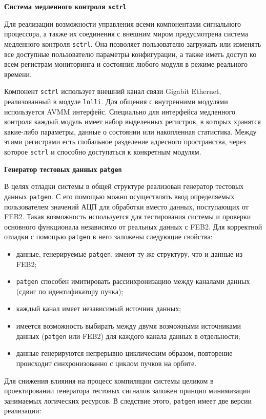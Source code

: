 \textbf{Система медленного контроля \texttt{sctrl}}\par
Для реализации возможности управления всеми компонентами сигнального процессора, а также их соединения с внешним миром предусмотрена система медленного контроля \texttt{sctrl}. Она позволяет пользователю загружать или изменять все доступные пользователю параметры конфигурации, а также иметь доступ ко всем регистрам мониторинга и состояния любого модуля в режиме реального времени.\par
Компонент \texttt{sctrl} использует внешний канал связи Gigabit Ethernet, реализованный в модуле \texttt{lolli}. Для общения с внутренними модулями используется AVMM интерфейс. Специально для интерфейса медленного контроля каждый модуль имеет набор выделенных регистров, в которых хранятся какие-либо параметры, данные о состоянии или накопленная статистика. Между этими регистрами есть глобальное разделение адресного пространства, через которое \texttt{sctrl} и способно доступаться к конкретным модулям.\par
\textbf{Генератор тестовых данных \texttt{patgen}}\par
В целях отладки системы в общей структуре реализован генератор тестовых данных \texttt{patgen}. С его помощью можно осуществлять ввод определяемых пользователем значений АЦП для обработки вместо данных, поступающих от FEB2. Такая возможность используется для тестирования системы и проверки основного функционала независимо от реальных данных с FEB2. Для корректной отладки с помощью \texttt{patgen} в него заложены следующие свойства:\par
\begin{itemize}
    \item данные, генерируемые \texttt{patgen}, имеют ту же структуру, что и данные из FEB2;
    \item \texttt{patgen} способен имитировать рассинхронизацию между каналами данных (сдвиг по идентификатору пучка);
    \item каждый канал имеет независимый источник данных;
    \item имеется возможность выбирать между двумя возможными источниками данных (\texttt{patgen} или FEB2) для каждого канала данных в отдельности;
    \item данные генерируются непрерывно циклическим образом, повторение происходит синхронизованно с циклом пучков на орбите.
\end{itemize}\par
Для снижения влияния на процесс компиляции системы целиком в проектировании генератора тестовых сигналов заложен принцип минимизации занимаемых логических ресурсов. В следствие этого, \texttt{patgen} имеет две версии реализации:\par

